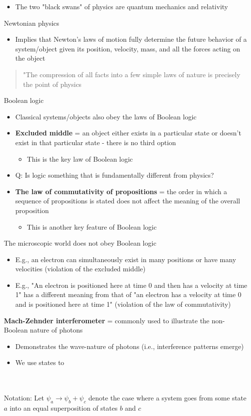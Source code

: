 \documentclass[a4paper]{article}
\begin{document}
    \begin{itemize}
        \item The two "black swans" of physics are quantum mechanics and relativity
    \end{itemize}
Newtonian physics 
    \begin{itemize}
        \item Implies that Newton's laws of motion fully determine the future behavior of a system/object given its position, velocity, mass, and all the forces acting on the object 
    \end{itemize}
    \begin{quote}
        "The compression of all facts into a few simple laws of nature is precisely the point of physics 
    \end{quote}
Boolean logic
    \begin{itemize}
        \item Classical systems/objects also obey the laws of Boolean logic
        \item \textbf{Excluded middle} = an object either exists in a particular state or doesn't exist in that particular state - there is no third option
            \begin{itemize}
                \item This is the key law of Boolean logic
            \end{itemize}
        \item Q: Is logic something that is fundamentally different from physics?
        \item \textbf{The law of commutativity of propositions} = the order in which a sequence of propositions is stated does not affect the meaning of the overall proposition
            \begin{itemize}
                \item This is another key feature of Boolean logic
            \end{itemize}
    \end{itemize}
The microscopic world does not obey Boolean logic
    \begin{itemize}
        \item E.g., an electron can simultaneously exist in many positions or have many velocities (violation of the excluded middle)
        \item E.g., "An electron is positioned here at time 0 and then has a velocity at time 1" has a different meaning from that of "an electron has a velocity at time 0 and is positioned here at time 1" (violation of the law of commutativity)
    \end{itemize}
\textbf{Mach-Zehnder interferometer} = commonly used to illustrate the non-Boolean nature of photons
    \begin{itemize}
        \item Demonstrates the wave-nature of photons (i.e., interference patterns emerge)
        \item We use states to 
    \end{itemize}
\\
\\
Notation: Let $\psi_a \rightarrow \psi_b + \psi_c$ denote the case where a system goes from some state $a$ into an equal superposition of states $b$ and $c$
\end{document}
